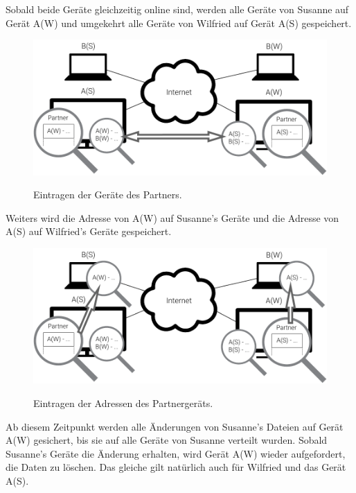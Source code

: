Sobald beide Geräte gleichzeitig online sind, werden alle Geräte von Susanne auf Gerät A(W)
und umgekehrt alle Geräte von Wilfried auf Gerät A(S) gespeichert.
\begin{figure}[htb]
	\centering
  \includegraphics[]{images/partnerschaften_3.pdf}
	\label{partnerschaften_3}
  \caption{Eintragen der Geräte des Partners.}
\end{figure}
Weiters wird die Adresse von A(W) auf Susanne's Geräte und die Adresse von A(S) auf Wilfried's Geräte gespeichert.
\begin{figure}[htb]
	\centering
  \includegraphics[]{images/partnerschaften_4.pdf}
	\label{partnerschaften_4}
  \caption{Eintragen der Adressen des Partnergeräts.}
\end{figure}
Ab diesem Zeitpunkt werden alle Änderungen von Susanne's Dateien auf Gerät A(W) gesichert,
bis sie auf alle Geräte von Susanne verteilt wurden. Sobald Susanne's Geräte die Änderung
erhalten, wird Gerät A(W) wieder aufgefordert, die Daten zu löschen. Das gleiche gilt natürlich
auch für Wilfried und das Gerät A(S).
